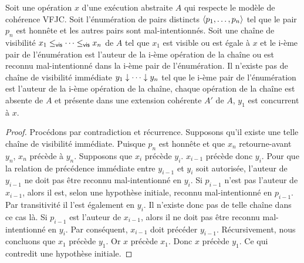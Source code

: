 \begin{proposition}
Soit une opération $x$ d'une exécution abstraite $A$ qui respecte le modèle de cohérence \ac{VFJC}.
Soit l'énumération de pairs distincts $\tuple*{p_1, \dotsc ,p_n}$ tel que le pair $p_n$ est honnête et les autres pairs sont mal-intentionnés.
Soit une chaîne de visibilité $x_1 \viseq \dotsb \viseq x_n$ de $A$ tel que $x_1$ est visible ou est égale à $x$ et le i-ème pair de l'énumération est l'auteur de la i-ème opération de la chaîne ou est reconnu mal-intentionné dans la i-ème pair de l'énumération.
Il n'existe pas de chaîne de visibilité immédiate $y_1 \idr \dotsb \idr y_n$ tel que le i-ème pair de l'énumération est l'auteur de la i-ème opération de la chaîne, chaque opération de la chaîne est absente de $A$ et présente dans une extension cohérente $A'$ de $A$, $y_1$ est concurrent à $x$.
\end{proposition}

\begin{proof}
Procédons par contradiction et récurrence.
Supposons qu'il existe une telle chaîne de visibilité immédiate.
Puisque $p_n$ est honnête et que $x_n$ retourne-avant $y_n$, $x_n$ précède à $y_n$.
Supposons que $x_i$ précède $y_i$.
$x_{i-1}$ précède donc $y_i$.
Pour que la relation de précédence immédiate entre $y_{i-1}$ et $y_i$ soit autorisée, l'auteur de $y_{i-1}$ ne doit pas être reconnu mal-intentionné en $y_i$.
Si $p_{i-1}$ n'est pas l'auteur de $x_{i-1}$, alors il est, selon une hypothèse initiale, reconnu mal-intentionné en $p_{i-1}$.
Par transitivité il l'est également en $y_i$.
Il n'existe donc pas de telle chaîne dans ce cas là.
Si $p_{i-1}$ est l'auteur de $x_{i-1}$, alors il ne doit pas être reconnu mal-intentionné en $y_i$.
Par conséquent, $x_{i-1}$ doit précéder $y_{i-1}$.
Récursivement, nous concluons que $x_1$ précède $y_1$.
Or $x$ précède $x_1$.
Donc $x$ précède $y_1$.
Ce qui contredit une hypothèse initiale.
\end{proof}


